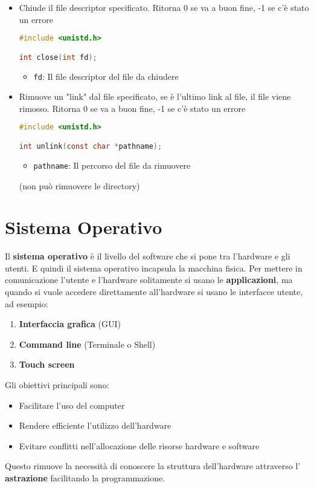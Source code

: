 \documentclass[a4paper]{article}
\begin{document}
\begin{itemize}
\item Chiude il file descriptor specificato. Ritorna 0 se va a buon fine, -1 se c'è
  stato un errore
  \begin{lstlisting}[language=C]
#include <unistd.h>

int close(int fd);
  \end{lstlisting}
  \begin{itemize}
    \item \texttt{fd}: Il file descriptor del file da chiudere
  \end{itemize}

\item Rimuove un "link" dal file specificato, se è l'ultimo link al file, il file
  viene rimosso. Ritorna 0 se va a buon fine, -1 se c'è stato un errore
  \begin{lstlisting}[language=C]
#include <unistd.h>

int unlink(const char *pathname);
  \end{lstlisting}
  \begin{itemize}
    \item \texttt{pathname}: Il percorso del file da rimuovere
  \end{itemize}
  (non può rimuovere le directory)

\end{itemize}

\section{Sistema Operativo}
Il \textbf{sistema operativo} è il livello del software che si pone tra l'hardware
e gli utenti. E quindi il sistema operativo incapsula la macchina fisica.
Per mettere in comunicazione l'utente e l'hardware solitamente si usano le 
\textbf{applicazioni}, ma quando si vuole accedere direttamente all'hardware
si usano le interfacce utente, ad esempio:
\begin{enumerate}
  \item \textbf{Interfaccia grafica} (GUI)
  \item \textbf{Command line} (Terminale o Shell)
  \item \textbf{Touch screen}
\end{enumerate}
\noindent
Gli obiettivi principali sono:
\begin{itemize}
  \item Facilitare l'uso del computer
  \item Rendere efficiente l'utilizzo dell'hardware
  \item Evitare conflitti nell'allocazione delle risorse hardware e software
\end{itemize}
Questo rimuove la necessità di conoscere la struttura dell'hardware attraverso l'
\textbf{astrazione} facilitando la programmazione.
\end{document}
